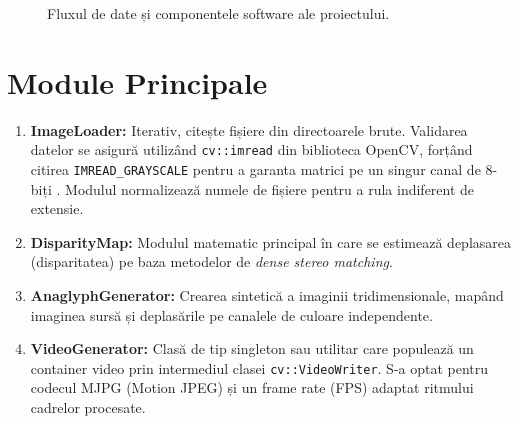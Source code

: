 \documentclass[12pt,a4paper]{report}
\begin{document}
\begin{figure}[H]
    \centering
    \caption{Fluxul de date și componentele software ale proiectului.}
    \label{fig:pipeline_diagram}
\end{figure}

\section{Module Principale}
\begin{enumerate}
    \item \textbf{ImageLoader:} Iterativ, citește fișiere din directoarele brute. Validarea datelor se asigură utilizând \texttt{cv::imread} din biblioteca OpenCV, forțând citirea \texttt{IMREAD\_GRAYSCALE} pentru a garanta matrici pe un singur canal de 8-biți \cite{opencv_docs}. Modulul normalizează numele de fișiere pentru a rula indiferent de extensie.
    \item \textbf{DisparityMap:} Modulul matematic principal în care se estimează deplasarea (disparitatea) pe baza metodelor de \textit{dense stereo matching}.
    \item \textbf{AnaglyphGenerator:} Crearea sintetică a imaginii tridimensionale, mapând imaginea sursă și deplasările pe canalele de culoare independente.
    \item \textbf{VideoGenerator:} Clasă de tip singleton sau utilitar care populează un container video prin intermediul clasei \texttt{cv::VideoWriter}. S-a optat pentru codecul MJPG (Motion JPEG) și un frame rate (FPS) adaptat ritmului cadrelor procesate.
\end{enumerate}
\end{document}

